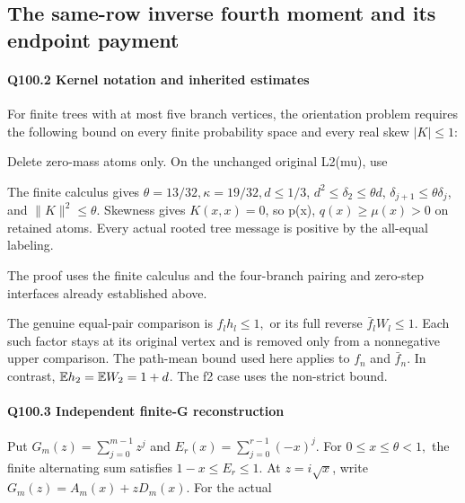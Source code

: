 \subsection{The same-row inverse fourth moment and its endpoint payment}\label{proof:Q5-C100}
\paragraph{Q100.2 Kernel notation and inherited estimates}

For finite trees with at most five branch vertices, the orientation
problem requires the following bound on every finite probability space
and every real skew \(|K|\le 1\):




Delete zero-mass atoms only. On the unchanged original L2(mu), use


The finite calculus gives \(\theta=13/32,\allowbreak  \kappa=19/32,\allowbreak  d\le1/3\), \(d^2\le\delta_2\le\theta d\), \(\delta_{j+1}\le\theta\delta_j\), and \(\|K\|^2\le\theta\).
Skewness gives \(K(x,\allowbreak x)=0\), so p(x), \(q(x)\ge \mu(x)>0\) on retained atoms.
Every actual rooted tree message is positive by the all-equal labeling.

The proof uses the finite calculus and the four-branch pairing and zero-step interfaces already established above.

The genuine equal-pair comparison is \(f_l h_l\le 1,\allowbreak \) or its full reverse
\(\bar f_l W_l\le 1.\) Each such factor stays at its original vertex and is removed
only from a nonnegative upper comparison. The path-mean bound used here applies to $f_n$ and $\bar f_n$. In contrast, $\mathbb E h_2=\mathbb E W_2=1+d$.
The f2 case uses the non-strict bound.

\paragraph{Q100.3 Independent finite-G reconstruction}

Put \(G_m(z)=\sum _{j=0}^{m-1} z^j\) and
\(E_r(x)=\sum _{j=0}^{r-1}(-x)^j.\) For \(0\le x\le \theta<1,\allowbreak \) the finite
alternating sum satisfies \(1-x\le E_r\le 1.\) At \(z=i \sqrt{x}\), write
\(G_m(z)=A_m(x)+zD_m(x).\) For the actual

